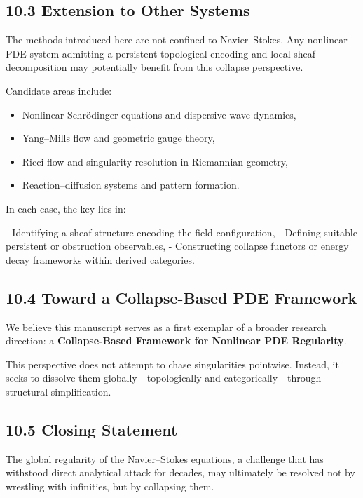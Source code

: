 \documentclass[11pt]{article}
\begin{document}
\subsection{10.3 Extension to Other Systems}

The methods introduced here are not confined to Navier–Stokes.  
Any nonlinear PDE system admitting a persistent topological encoding and local sheaf decomposition may potentially benefit from this collapse perspective.

Candidate areas include:

\begin{itemize}
  \item Nonlinear Schrödinger equations and dispersive wave dynamics,
  \item Yang–Mills flow and geometric gauge theory,
  \item Ricci flow and singularity resolution in Riemannian geometry,
  \item Reaction–diffusion systems and pattern formation.
\end{itemize}

In each case, the key lies in:

- Identifying a sheaf structure encoding the field configuration,
- Defining suitable persistent or obstruction observables,
- Constructing collapse functors or energy decay frameworks within derived categories.

\subsection{10.4 Toward a Collapse-Based PDE Framework}

We believe this manuscript serves as a first exemplar of a broader research direction:  
a \textbf{Collapse-Based Framework for Nonlinear PDE Regularity}.

This perspective does not attempt to chase singularities pointwise.  
Instead, it seeks to dissolve them globally—topologically and categorically—through structural simplification.

\subsection{10.5 Closing Statement}

The global regularity of the Navier–Stokes equations,  
a challenge that has withstood direct analytical attack for decades,  
may ultimately be resolved not by wrestling with infinities,  
but by collapsing them.
\end{document}
